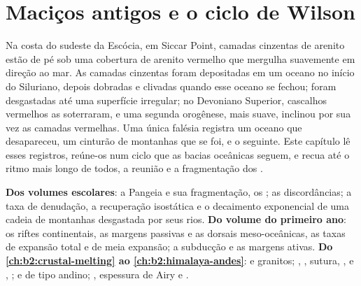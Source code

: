 \chapter{Maciços antigos e o ciclo de Wilson}\label{ch:b2:wilson-cycle}

Na costa do sudeste da Escócia, em Siccar Point, camadas cinzentas de arenito estão de pé
sob uma cobertura de arenito vermelho que mergulha suavemente em direção ao mar. As camadas cinzentas foram depositadas em
um oceano no início do Siluriano, depois dobradas e clivadas quando esse oceano se fechou; foram desgastadas
até uma superfície irregular; no Devoniano Superior, cascalhos vermelhos as soterraram, e uma segunda
orogênese, mais suave, inclinou por sua vez as camadas vermelhas. Uma única falésia registra um oceano que
desapareceu, um cinturão de montanhas que se foi, e o seguinte. Este capítulo lê esses registros,
reúne-os num ciclo que as bacias oceânicas seguem, e recua até o ritmo mais longo de
todos, a reunião e a fragmentação dos .

\begin{recall}
\textbf{Dos volumes escolares}: a Pangeia e sua fragmentação, os ; as discordâncias;
a taxa de denudação, a recuperação isostática e o decaimento exponencial de uma cadeia de montanhas desgastada
por seus rios. \textbf{Do volume do primeiro ano}: os riftes continentais, as margens passivas e as
dorsais meso-oceânicas, as taxas de expansão total e de meia expansão; a subducção e as margens ativas.
\textbf{Do \cref{ch:b2:crustal-melting} ao \cref{ch:b2:himalaya-andes}}:  e
granitos; , , sutura, ,  e , ;  e
de tipo andino; , espessura de Airy e .
\end{recall}

